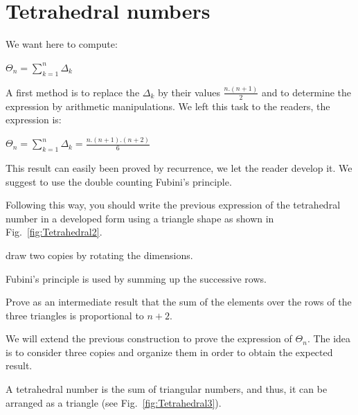 \section{Tetrahedral numbers}
\label{sec:tetraedralNumbers}

We want here to compute:

$\Theta_n =  \sum_{k=1}^{n} \Delta_k$
\medskip

A first method is to replace the $\Delta_k$ by their values $\frac{n.(n+1)}{2}$ and to determine the expression
by arithmetic manipulations.
We left this task to the readers, the expression is:

$\Theta_n =  \sum_{k=1}^{n} \Delta_k = \frac{n.(n+1).(n+2)}{6}$
\medskip

This result can easily been proved by recurrence, we let the reader develop it. 
We suggest to use the double counting Fubini's principle.

Following this way, you should write the previous expression of the tetrahedral number in a developed form 
using a triangle shape as shown in Fig.~\ref{fig:Tetrahedral2}.

draw two copies by rotating the dimensions.

Fubini's principle is used by summing up the successive rows.

Prove as an intermediate result that the sum of the elements over the rows of the three triangles is proportional to $n+2$.
\medskip

\noindent {}
\medskip

We will extend the previous construction to prove the expression of $\Theta_n$.
The idea is to consider three copies and organize them in order to obtain the expected result.

A tetrahedral number is the sum of triangular numbers, and thus, it can be arranged as a triangle (see Fig.~\ref{fig:Tetrahedral3}).

